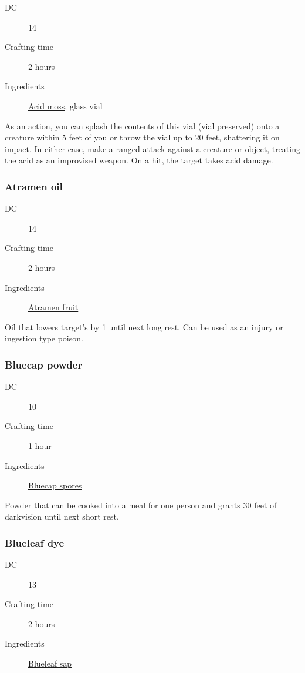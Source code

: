 \begin{description}
\item [DC] 14 \nature
\item [Crafting time] 2 hours
\item [Ingredients] \hyperref[acid_moss]{Acid moss}, glass vial
\end{description}

As an action, you can splash the contents of this vial (vial preserved) onto a creature within 5 feet of you or throw the vial up to 20 feet, shattering it on impact. In either case, make a ranged attack against a creature or object, treating the acid as an improvised weapon. On a hit, the target takes  acid damage.

\subsubsection{Atramen oil}
\label{Atramen oil}

\begin{description}
\item [DC] 14 \nature
\item [Crafting time] 2 hours
\item [Ingredients] \hyperref[Atramen]{Atramen fruit}
\end{description}

Oil that lowers target's \constitution by 1 until next long rest. Can be used as an injury or ingestion type poison.

\subsubsection{Bluecap powder}
\label{Bluecap powder}

\begin{description}
\item [DC] 10 \survival
\item [Crafting time] 1 hour
\item [Ingredients] \hyperref[Bluecap]{Bluecap spores}
\end{description}

Powder that can be cooked into a meal for one person and grants 30 feet of darkvision until next short rest.

\subsubsection{Blueleaf dye}
\label{Blueleaf dye}

\begin{description}
\item [DC] 13 \nature
\item [Crafting time] 2 hours
\item [Ingredients] \hyperref[Blueleaf]{Blueleaf sap}
\end{description}

